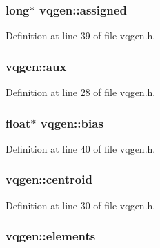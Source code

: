 \subsubsection[{\texorpdfstring{assigned}{assigned}}]{\setlength{\rightskip}{0pt plus 5cm}long$\ast$ vqgen\+::assigned}\hypertarget{structvqgen_af5cf3711c7395b27eb60442079cc1314}{}\label{structvqgen_af5cf3711c7395b27eb60442079cc1314}


Definition at line 39 of file vqgen.\+h.

\subsubsection[{\texorpdfstring{aux}{aux}}]{ vqgen\+::aux}\hypertarget{structvqgen_a0552a2f8ee4b71b1e5f81b7a9ed04165}{}\label{structvqgen_a0552a2f8ee4b71b1e5f81b7a9ed04165}


Definition at line 28 of file vqgen.\+h.

\subsubsection[{\texorpdfstring{bias}{bias}}]{\setlength{\rightskip}{0pt plus 5cm}float$\ast$ vqgen\+::bias}\hypertarget{structvqgen_a732fdab429939b8aea11f4ebc09f7b0d}{}\label{structvqgen_a732fdab429939b8aea11f4ebc09f7b0d}


Definition at line 40 of file vqgen.\+h.

\subsubsection[{\texorpdfstring{centroid}{centroid}}]{ vqgen\+::centroid}\hypertarget{structvqgen_aec939b5c1ed9121f1ac1ecd36ed77c85}{}\label{structvqgen_aec939b5c1ed9121f1ac1ecd36ed77c85}


Definition at line 30 of file vqgen.\+h.

\subsubsection[{\texorpdfstring{elements}{elements}}]{ vqgen\+::elements}\hypertarget{structvqgen_ae9cf105abbc253ea85749b1a3c542967}{}\label{structvqgen_ae9cf105abbc253ea85749b1a3c542967}


